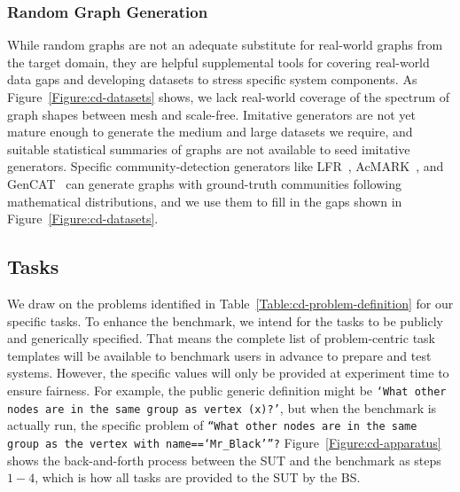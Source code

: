 \subsubsection{Random Graph Generation}

While random graphs are not an adequate substitute for real-world graphs from the target domain, they are helpful supplemental tools for covering real-world data gaps and developing datasets to stress specific system components.
As Figure~\ref{Figure:cd-datasets} shows, we lack real-world coverage of the spectrum of graph shapes between mesh and scale-free. 
Imitative generators are not yet mature enough to generate the medium and large datasets we require, and suitable statistical summaries of graphs are not available to seed imitative generators.
Specific community-detection generators like LFR~\cite{Lancichinetti2008}, AcMARK~\cite{Maekawa2019}, and GenCAT~\cite{Maekawa2023} can generate graphs with ground-truth communities following mathematical distributions, and we use them to fill in the gaps shown in Figure~\ref{Figure:cd-datasets}.





\subsection{Tasks}
We draw on the problems identified in Table~\ref{Table:cd-problem-definition} for our specific tasks. 
To enhance the benchmark, we intend for the tasks to be publicly and generically specified.
That means the complete list of problem-centric task templates will be available to benchmark users in advance to prepare and test systems. 
However, the specific values will only be provided at experiment time to ensure fairness.
For example, the public generic definition might be \texttt{`What other nodes are in the same group as vertex (x)?'}, but when the benchmark is actually run, the specific problem of \texttt{``What other nodes are in the same group as the vertex with name==`Mr\_Black'''?}
Figure~\ref{Figure:cd-apparatus} shows the back-and-forth process between the SUT and the benchmark as steps $1-4$, which is how all tasks are provided to the \ac{SUT} by the \ac{BS}.

